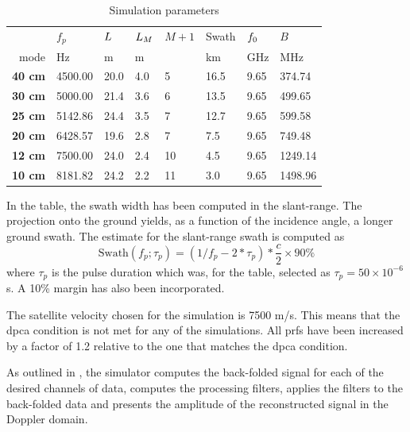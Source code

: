 \begin{table}[ht!]
\begin{center}
 \caption{Simulation parameters}
 \label{tb:simulation}
 \begin{tabular}{r|l|l|l|l|l|l|l}
  {} & {\bf $f_p$} & {\bf $L$} & {\bf $L_M$} & {\bf $M+1$} & {Swath} & {\bf $f_0$} & {\bf $B$}\\
 {mode}      & {Hz}    & m    & m   &   & km   & GHz  & MHz\\\hline
 {\bf 40 cm} & 4500.00 & 20.0 & 4.0 & 5 & 16.5 & 9.65 & 374.74\\\hline
 {\bf 30 cm} & 5000.00 & 21.4 & 3.6 & 6 & 13.5 & 9.65 & 499.65\\\hline
 {\bf 25 cm} & 5142.86 & 24.4 & 3.5 & 7 & 12.7 & 9.65 & 599.58\\\hline
 {\bf 20 cm} & 6428.57 & 19.6 & 2.8 & 7 & 7.5  & 9.65 & 749.48\\\hline
 {\bf 12 cm} & 7500.00 & 24.0 & 2.4 & 10 & 4.5 & 9.65 & 1249.14\\\hline
 {\bf 10 cm} & 8181.82 & 24.2 & 2.2 & 11 & 3.0 & 9.65 & 1498.96\\\hline
 \end{tabular}
 \end{center}
\end{table}
In the table, the swath width has been computed in the slant-range. The projection onto the ground yields, as a function of the incidence angle, a longer ground swath. The estimate for the slant-range swath is computed as
\begin{equation}
 \text{Swath}(f_p; \tau_p) = \left(1/f_p - 2*\tau_p\right)*\frac{c}{2}\times 90\%
\end{equation}
where $\tau_p$ is the pulse duration which was, for the table, selected as $\tau_p=50\times10^{-6}$ s. A 10\% margin has also been incorporated.
\par
The satellite velocity chosen for the simulation is 7500 m/s. This means that the \gls{dpca} condition is not met for any of the simulations. All \gls{prf}s have been increased by a factor of 1.2 relative to the one that matches the \gls{dpca} condition.
\par
As outlined in , the simulator computes the back-folded signal for each of the desired channels of data, computes the processing filters, applies the filters to the back-folded data and presents the amplitude of the reconstructed signal in the Doppler domain.
